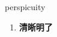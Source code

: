
\begin{frame}
{\huge perspicuity}
\begin{center}
\begin{enumerate}\Large
  \item \textbf{清晰明了}
\end{enumerate}
\end{center}
\end{frame}
